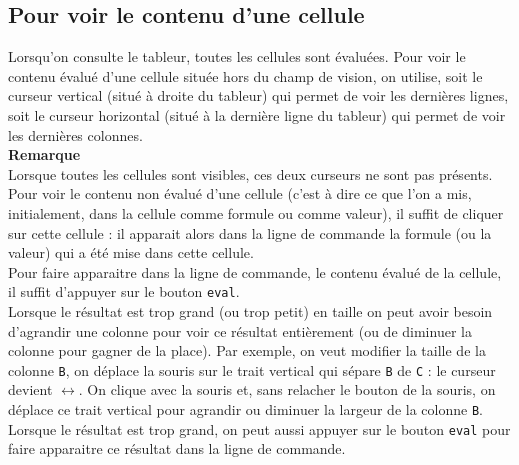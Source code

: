 \documentclass[a4paper,11pt]{book}
\begin{document}
\subsection{Pour voir le contenu d'une cellule}
Lorsqu'on consulte le tableur, toutes les cellules sont \'evalu\'ees. 
Pour voir le contenu \'evalu\'e d'une cellule situ\'ee hors du champ de vision,
on utilise, soit le curseur vertical (situ\'e \`a droite du tableur) qui permet
 de voir les derni\`eres lignes, soit le curseur horizontal (situ\'e \`a la 
derni\`ere ligne du tableur) qui permet de voir les derni\`eres colonnes.\\
{\bf Remarque}\\
Lorsque toutes les cellules sont visibles, ces deux curseurs ne sont pas 
pr\'esents. \\
Pour voir le contenu non \'evalu\'e d'une cellule (c'est \`a dire ce que l'on 
a mis, initialement, dans la cellule comme formule ou comme valeur), 
il suffit de cliquer sur 
cette cellule : il apparait alors dans la ligne de commande la formule (ou 
la valeur) qui a \'et\'e mise dans cette cellule.\\
Pour faire apparaitre dans la ligne de commande, le contenu \'evalu\'e de 
la cellule, il suffit d'appuyer sur le bouton {\tt eval}.\\
Lorsque le r\'esultat est trop grand (ou trop petit) en taille on peut avoir 
besoin d'agrandir une colonne pour voir ce r\'esultat enti\`erement (ou de 
diminuer la colonne pour gagner de la place). Par exemple, on veut modifier 
la taille de la colonne {\tt B},  on 
d\'eplace la souris sur le trait vertical qui s\'epare {\tt B} de {\tt C} : 
le curseur devient $\leftrightarrow$. On clique avec la souris et, sans 
relacher le bouton de la souris, on d\'eplace ce trait vertical pour agrandir 
ou diminuer la largeur de la colonne {\tt B}.
Lorsque le r\'esultat est trop grand, on peut aussi appuyer sur le bouton 
{\tt eval} pour faire apparaitre ce r\'esultat dans la ligne de commande.
\end{document}
